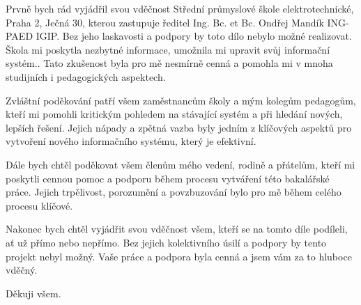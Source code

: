 \begin{acknowledgement}
    Prvně bych rád vyjádřil svou vděčnost Střední průmyslové škole elektrotechnické, Praha 2, Ječná 30, kterou zastupuje ředitel Ing. Bc. et Bc. Ondřej Mandík ING-PAED IGIP. Bez jeho laskavosti a podpory by toto dílo nebylo možné realizovat. Škola mi poskytla nezbytné informace, umožnila mi upravit svůj informační systém.. Tato zkušenost byla pro mě nesmírně cenná a pomohla mi v mnoha studijních i pedagogických aspektech.
    
    Zvláštní poděkování patří všem zaměstnancům školy a mým kolegům pedagogům, kteří mi pomohli kritickým pohledem na stávající systém a při hledání nových, lepších řešení. Jejich nápady a zpětná vazba byly jedním z klíčových aspektů pro vytvoření nového informačního systému, který je efektivní.
    
    Dále bych chtěl poděkovat všem členům mého vedení, rodině a přátelům, kteří mi poskytli cennou pomoc a podporu během procesu vytváření této bakalářské práce. Jejich trpělivost, porozumění a povzbuzování bylo pro mě během celého procesu klíčové.
    
    Nakonec bych chtěl vyjádřit svou vděčnost všem, kteří se na tomto díle podíleli, ať už přímo nebo nepřímo. Bez jejich kolektivního úsilí a podpory by tento projekt nebyl možný. Vaše práce a podpora byla cenná a jsem vám za to hluboce vděčný.
    
    Děkuji všem.
\end{acknowledgement}